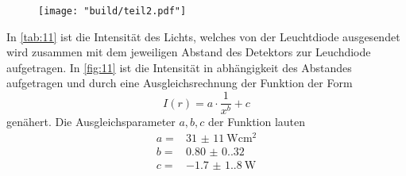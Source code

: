 \begin{figure}[H]
    \caption{}
    \label{fig:11}
    \centering
    \texttt{[image: "build/teil2.pdf"]}
\end{figure}
In \autoref{tab:11} ist die Intensität des Lichts, welches von der Leuchtdiode ausgesendet wird 
zusammen mit dem jeweiligen Abstand des Detektors zur Leuchdiode aufgetragen. In \autoref{fig:11}
ist die Intensität in abhängigkeit des Abstandes aufgetragen und durch eine Ausgleichsrechnung 
der Funktion der Form 
\begin{equation}
    I \left(r\right) = a \cdot \frac{1}{x^b} + c
\end{equation}
genähert.
Die Ausgleichsparameter $a, b, c$ der Funktion lauten
\begin{align*}
    a = & \qty{31(11)}{\watt\centi\meter\squared}   \\
    b = & \qty{0.80(0.32)}{}     \\
    c = & \qty{-1.7(1.8)}{\watt}       
\end{align*}

\label{sec:Auswertung}
